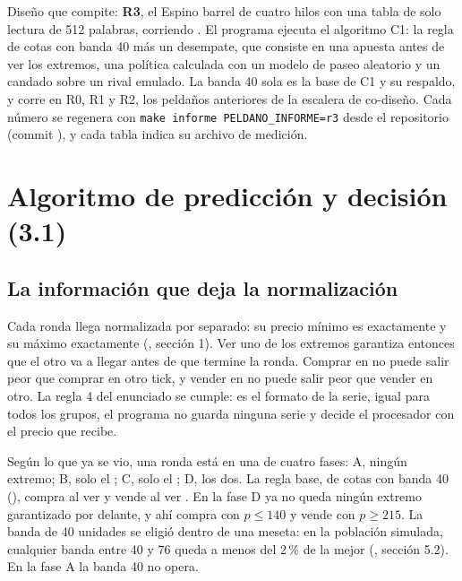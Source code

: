 %
%


\noindent Diseño que compite: \textbf{R3}, el Espino barrel de cuatro hilos con una tabla de solo lectura de 512 palabras, corriendo . El programa ejecuta el algoritmo C1: la regla de cotas con banda 40 más un desempate, que consiste en una apuesta antes de ver los extremos, una política calculada con un modelo de paseo aleatorio y un candado sobre un rival emulado. La banda 40 sola es la base de C1 y su respaldo, y corre en R0, R1 y R2, los peldaños anteriores de la escalera de co-diseño. Cada número se regenera con \texttt{make informe PELDANO\_INFORME=r3} desde el repositorio (commit \texttt{\commitinforme}), y cada tabla indica su archivo de medición.

\section{Algoritmo de predicción y decisión (3.1)}

\subsection{La información que deja la normalización}

Cada ronda llega normalizada por separado: su precio mínimo es exactamente \cifraPrecioMin{} y su máximo exactamente \cifraPrecioMax{} (, sección 1). Ver uno de los extremos garantiza entonces que el otro va a llegar antes de que termine la ronda. Comprar en \cifraPrecioMin{} no puede salir peor que comprar en otro tick, y vender en \cifraPrecioMax{} no puede salir peor que vender en otro. La regla 4 del enunciado se cumple: es el formato de la serie, igual para todos los grupos, el programa no guarda ninguna serie y decide el procesador con el precio que recibe.

Según lo que ya se vio, una ronda está en una de cuatro fases: A, ningún extremo; B, solo el \cifraPrecioMax; C, solo el \cifraPrecioMin; D, los dos. La regla base, de cotas con banda 40 (), compra al ver \cifraPrecioMin{} y vende al ver \cifraPrecioMax. En la fase D ya no queda ningún extremo garantizado por delante, y ahí compra con $p \le 140$ y vende con $p \ge 215$. La banda de 40 unidades se eligió dentro de una meseta: en la población simulada, cualquier banda entre 40 y 76 queda a menos del 2\,\% de la mejor (, sección 5.2). En la fase A la banda 40 no opera.

